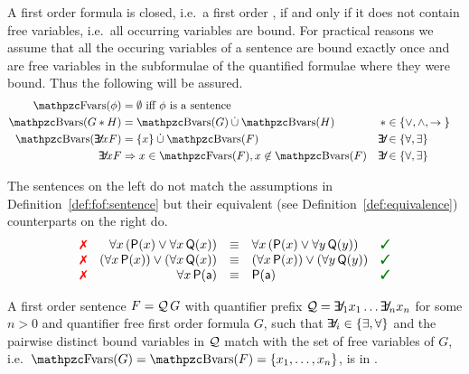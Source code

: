 \begin{definition}\label{def:fof:closed}\label{def:fof:sentence}
	A first order formula is closed, i.e.~a first order ,
	if and only if it does not contain free variables, 
	i.e.~all occurring variables are bound.
	For practical reasons we assume that all the occuring variables of a sentence
	are bound exactly once
	and are free variables
	in the subformulae of the quantified formulae where they were bound.
	Thus the following will be assured.
	\begin{align*}
		\fvar(\phi) &= \emptyset
		\text{ iff }\phi\text{ is a sentence}
		\\
		\bvar(G \connect H) &= \bvar(G)\disjointunion\bvar(H)
		&\connect& \in \SetOfConnectives
		\\
		\bvar(\quantify x F) &= \{x\}\disjointunion\bvar(F)
		&\quantify& \in \SetOfQuantifiers
		\\
		\quantify x F &\Rightarrow
		x\in\fvar(F), x\not\in\bvar(F)
		&\quantify& \in \SetOfQuantifiers
	\end{align*}
\end{definition}

\begin{example}The sentences on the left do not match
	the assumptions in Definition~\vref{def:fof:sentence}
	but their {equivalent (see Definition~\vref{def:equivalence})}
	counterparts on the right do.
	\[
	\begin{array}{rrcll}
		 \text{\color{colLo}{\xmark}}
		& \forall x\, ({\mP(x) \lor \forall x\, {\mQ(x)}})
		& {\equiv}
		& \forall x\, ({\mP(x) \lor \forall y\, {\mQ(y)}})
		& \text{\color{colHi}{\cmark}}
		\\ \text{\color{colLo}{\xmark}}
		& (\forall x\, {\mP(x)}) \lor (\forall x\, {\mQ(x)})
		& {\equiv}
		& (\forall x\, {\mP(x)}) \lor (\forall y\, {\mQ(y)})
		& \text{\color{colHi}{\cmark}}
		\\
		\text{\color{colLo}{\xmark}}
		&  \forall x\, {\mP(\ma)}
		& {\equiv}
		& \mP(\ma)
		& \text{\color{colHi}{\cmark}}
	\end{array}
	\]

\end{example}

\begin{definition}\label{def:prenex:normal:form}
	A first order sentence 
	\( F = \mathcal{Q}\,G \)
	with quantifier prefix 
	\( \mathcal{Q} = \quantify_1 x_1 \ldots \quantify_n x_n \)
	for some \( n > 0 \)
	and quantifier free first order formula \( G \),
	such that
	\( \quantify_i \in \{ \exists, \forall \} \) 
	and the pairwise distinct bound variables
	in \(\mathcal{Q}\)
	match with the set of free variables of \(G\), 
	i.e.~\( \fvar(G) = \bvar(F) = \{ x_1,\ldots,x_n \} \),
	is in .
\end{definition}


